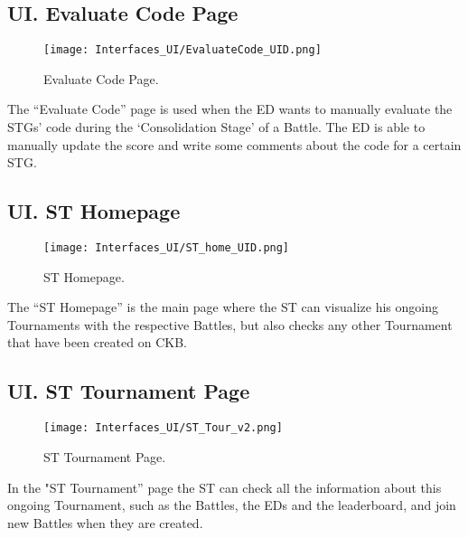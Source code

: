 \subsection*{UI\cui . Evaluate Code Page}

\begin{figure}[H]
    \begin{center}
        \texttt{[image: Interfaces\_UI/EvaluateCode\_UID.png]}
        \caption{Evaluate Code Page.}
        \label{fig:evaluate_code_page}%
    \end{center}   
\end{figure}

The “Evaluate Code” page is used when the ED wants to manually evaluate the STGs’ code during the ‘Consolidation Stage’ of a Battle. The ED is able to manually update the score and write some comments about the code for a certain STG. 

\subsection*{UI\cui . ST Homepage}

\begin{figure}[H]
    \begin{center}
        \texttt{[image: Interfaces\_UI/ST\_home\_UID.png]}
        \caption{ST Homepage.}
        \label{fig:st_homepage}%
    \end{center}
\end{figure}

The “ST Homepage” is the main page where the ST can visualize his ongoing Tournaments with the respective Battles, but also checks any other Tournament that have been created on CKB. 

\subsection*{UI\cui . ST Tournament Page}

\begin{figure}[H]
    \begin{center}
        \texttt{[image: Interfaces\_UI/ST\_Tour\_v2.png]}
        \caption{ST Tournament Page.}
        \label{fig:st_tournament_page}%
    \end{center}
\end{figure}

In the "ST Tournament” page the ST can check all the information about this ongoing Tournament, such as the Battles, the EDs and the leaderboard, and join new Battles when they are created.

